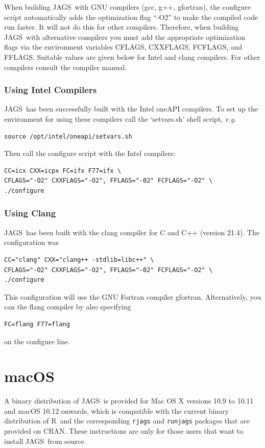 \documentclass[11pt, a4paper, titlepage]{article}
\newcommand{\JAGS}{\textsf{JAGS}}
\newcommand{\R}{\textsf{R}}
\newcommand{\code}[1]{{\bgroup{\normalfont\ttfamily #1}\egroup}}
\newcommand{\file}[1]{{`\normalfont\textsf{#1}'}}
\begin{document}
When building \JAGS\ with GNU compilers (\code{gcc}, \code{g++},
\code{gfortran}), the configure script automatically adds the
optimization flag ``-O2'' to make the compiled code run faster. It
will not do this for other compilers.  Therefore, when building
\JAGS\ with alternative compilers you must add the appropriate
optimization flags via the environment variables \code{CFLAGS},
\code{CXXFLAGS}, \code{FCFLAGS}, and \code{FFLAGS}. Suitable values
are given below for Intel and clang compilers. For other compilers
consult the compiler manual.

\subsubsection{Using Intel Compilers}

\JAGS\ has been successfully built with the Intel oneAPI compilers. To
set up the environment for using these compilers call the
\file{setvars.sh} shell script, {\em e.g.}
\begin{verbatim}
source /opt/intel/oneapi/setvars.sh
\end{verbatim}
Then call the configure script with the Intel compilers:
\begin{verbatim}
CC=icx CXX=icpx FC=ifx F77=ifx \
CFLAGS="-O2" CXXFLAGS="-O2", FFLAGS="-02" FCFLAGS="-O2" \
./configure 
\end{verbatim}

\subsubsection{Using Clang}

\JAGS\ has been built with the clang compiler for C and C++ (version 21.4).
The configuration was
\begin{verbatim}
CC="clang" CXX="clang++ -stdlib=libc++" \
CFLAGS="-O2" CXXFLAGS="-O2", FFLAGS="-02" FCFLAGS="-O2" \
./configure
\end{verbatim}
This configuration will use the GNU Fortran compiler \code{gfortran}.
Alternatively, you can the flang compiler by also specifying
\begin{verbatim}
FC=flang F77=flang
\end{verbatim}
on the configure line.

\clearpage
\section{macOS}

A binary distribution of \JAGS\ is provided for Mac OS X versions 
10.9 to 10.11 and macOS 10.12 onwards, which is compatible with the
current binary distribution of \R\ and the corresponding \texttt{rjags} 
and \texttt{runjags} packages that are provided on CRAN. These instructions 
are only for those users that want to install \JAGS\ from source.
\end{document}
